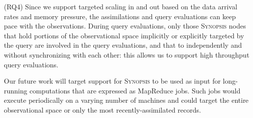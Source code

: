 (RQ4) Since we support targeted scaling in and out based on the data arrival rates and memory pressure, the assimilations and query evaluations can keep pace with the observations. During query evaluations,  only those \textsc{Synopsis} nodes that hold portions of the observational space implicitly or explicitly targeted by the query are involved in the query evaluations, and that to independently and without synchronizing with each other: this allows us to support high throughput query evaluations.

Our future work will target support for \textsc{Synopsis} to be used as input for long-running computations that are expressed as MapReduce jobs. Such jobs would execute periodically on a varying number of machines and could target the entire observational space or only the most recently-assimilated records.
